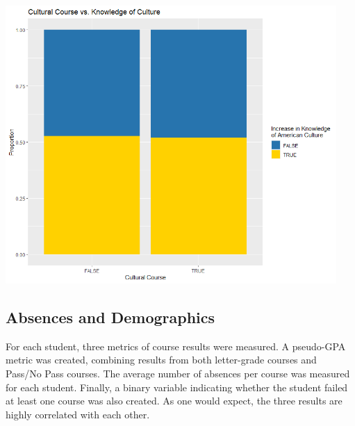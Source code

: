 \documentclass[12pt,letterpaper]{article}
\begin{document}
\begin{center}
    \includegraphics[width = \textwidth, height = 400]
    {Plots/lol_culture.png}
\end{center}


\subsection{Absences and Demographics}

For each student, three metrics of course results were measured. A pseudo-GPA metric was created, combining results from both letter-grade courses and Pass/No Pass courses. The average number of absences per course was measured for each student. Finally, a binary variable indicating whether the student failed at least one course was also created. As one would expect, the three results are highly correlated with each other.
\end{document}
